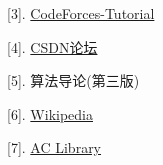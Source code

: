 \documentclass{article}
\begin{document}
[3]. \href{https://codeforces.com/blog/entry/101271}{CodeForces-Tutorial}

[4]. \href{https://blog.csdn.net/Q_M_X_D_D_/article/details/89924963?spm=1001.2101.3001.6650.1&utm_medium=distribute.pc_relevant.none-task-blog-2%7Edefault%7ECTRLIST%7ERate-1-89924963-blog-81060586.235%5Ev28%5Epc_relevant_t0_download&depth_1-utm_source=distribute.pc_relevant.none-task-blog-2%7Edefault%7ECTRLIST%7ERate-1-89924963-blog-81060586.235%5Ev28%5Epc_relevant_t0_download&utm_relevant_index=2}{CSDN论坛}

[5]. 算法导论(第三版)

[6]. \href{https://en.wikipedia.org/wiki/Segment_tree}{Wikipedia}

[7]. \href{https://atcoder.github.io/ac-library/production/document_en/lazysegtree.html}{AC Library}
\end{document}
